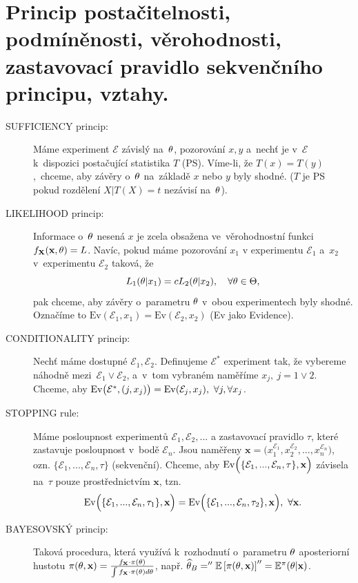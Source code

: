 \chapter{Princip postačitelnosti, podmíněnosti, věrohodnosti, zastavovací pravidlo sekvenčního principu, vztahy.}
\begin{description}
	\item[SUFFICIENCY princip:] Máme experiment $\mathcal{E}$ závislý na~$\theta$, pozorování $x,y$ a~nechť je v~$\mathcal{E}$ k~dispozici postačující statistika $T$ (PS). Víme-li, že $T(x)=T(y)$,~chceme, aby závěry o~$\theta$ na~základě $x$ nebo $y$ byly shodné. ($T$ je PS pokud rozdělení $X|T(X)=t$ nezávisí na~$\theta$).
	
	\item[LIKELIHOOD princip:] Informace o~$\theta$ nesená $x$ je zcela obsažena ve~věrohodnostní funkci $f_{\textbf{X}}(\textbf{x},\theta)=L$. Navíc, pokud máme pozorování $x_1$ v experimentu $\mathcal{E}_1$ a~$x_2$ v~experimentu $\mathcal{E}_2$ taková, že 
	$$ L_1(\theta|x_1)=c L_2(\theta|x_2),\quad\forall\theta\in\Theta,$$
	pak chceme, aby závěry o~parametru $\theta$ v~obou experimentech byly shodné. Označíme to $\mathrm{Ev}(\mathcal{E}_1,x_1)=\mathrm{Ev}(\mathcal{E}_2,x_2)$ (Ev jako Evidence). 
	\item[CONDITIONALITY princip:] Nechť máme dostupné $\mathcal{E}_1,\mathcal{E}_2$. Definujeme $\mathcal{E}^*$ experiment tak, že vybereme náhodně mezi~$\mathcal{E}_1 \vee \mathcal{E}_2$, a~v~tom vybraném naměříme $x_j,~j=1\vee 2$. Chceme, aby $\mathrm{Ev}\big(\mathcal{E}^*,(j,x_j)\big)=\mathrm{Ev}(\mathcal{E}_j,x_j),~\forall j,\forall x_j$.
	\item[STOPPING rule:] Máme posloupnost experimentů $\mathcal{E}_1,\mathcal{E}_2,...$ a zastavovací pravidlo $\tau$, které zastavuje posloupnost v~bodě $\mathcal{E}_n$. Jsou naměřeny $\textbf{x}=\Big( x_1^{\mathcal{E}_1},x_2^{\mathcal{E}_2},...,x_n^{\mathcal{E}_n} \Big)$, ozn. $\{ \mathcal{E}_1,...,\mathcal{E}_n,\tau \}$ (sekvenční). Chceme, aby $\mathrm{Ev}\Big( \{ \mathcal{E}_1,...,\mathcal{E}_n,\tau \},\textbf{x} \Big)$ závisela na~$\tau$ pouze prostřednictvím $\textbf{x}$, tzn. $$\mathrm{Ev}\Big( \{ \mathcal{E}_1,...,\mathcal{E}_n,\tau_1 \},\textbf{x} \Big)=\mathrm{Ev}\Big( \{ \mathcal{E}_1,...,\mathcal{E}_n,\tau_2 \},\textbf{x} \Big),~\forall \textbf{x}.$$
	\item[BAYESOVSKÝ princip:] Taková procedura, která využívá k~rozhodnutí o~parametru $\theta$ aposteriorní hustotu $\pi(\theta,\textbf{x})=\frac{f_{\textbf{X}}\cdot\pi(\theta)}{\int f_{\textbf{X}}\cdot\pi(\theta) d\theta}$, např. $\widehat{\theta}_B=''\mathbb{E}\left[ \pi(\theta,\textbf{x}) \right]''=\mathbb{E}^\pi(\theta|\textbf{x})$.
\end{description}

